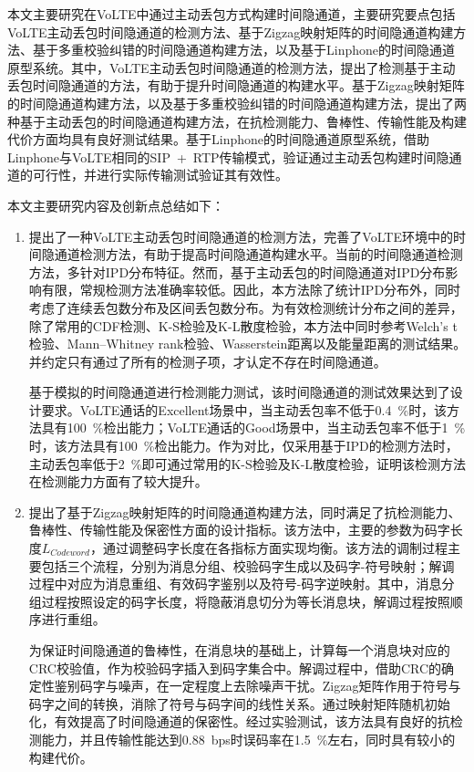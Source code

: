 \begin{conclusion}

本文主要研究在VoLTE中通过主动丢包方式构建时间隐通道，主要研究要点包括VoLTE主动丢包时间隐通道的检测方法、基于Zigzag映射矩阵的时间隐通道构建方法、基于多重校验纠错的时间隐通道构建方法，以及基于Linphone的时间隐通道原型系统。其中，VoLTE主动丢包时间隐通道的检测方法，提出了检测基于主动丢包时间隐通道的方法，有助于提升时间隐通道的构建水平。基于Zigzag映射矩阵的时间隐通道构建方法，以及基于多重校验纠错的时间隐通道构建方法，提出了两种基于主动丢包的时间隐通道构建方法，在抗检测能力、鲁棒性、传输性能及构建代价方面均具有良好测试结果。基于Linphone的时间隐通道原型系统，借助Linphone与VoLTE相同的SIP\ +\ RTP传输模式，验证通过主动丢包构建时间隐通道的可行性，并进行实际传输测试验证其有效性。

本文主要研究内容及创新点总结如下：
\begin{enumerate}
    \item
    提出了一种VoLTE主动丢包时间隐通道的检测方法，完善了VoLTE环境中的时间隐通道检测方法，有助于提高时间隐通道构建水平。当前的时间隐通道检测方法，多针对IPD分布特征。然而，基于主动丢包的时间隐通道对IPD分布影响有限，常规检测方法准确率较低。因此，本方法除了统计IPD分布外，同时考虑了连续丢包数分布及区间丢包数分布。为有效检测统计分布之间的差异，除了常用的CDF检测、K-S检验及K-L散度检验，本方法中同时参考Welch's t检验、Mann–Whitney rank检验、Wasserstein距离以及能量距离的测试结果。并约定只有通过了所有的检测子项，才认定不存在时间隐通道。
    
    基于模拟的时间隐通道进行检测能力测试，该时间隐通道的测试效果达到了设计要求。VoLTE通话的Excellent场景中，当主动丢包率不低于{0.4\ \%}时，该方法具有{100\ \%}检出能力；VoLTE通话的Good场景中，当主动丢包率不低于{1\ \%}时，该方法具有{100\ \%}检出能力。作为对比，仅采用基于IPD的检测方法时，主动丢包率低于{2\ \%}即可通过常用的K-S检验及K-L散度检验，证明该检测方法在检测能力方面有了较大提升。
    
    \item
    提出了基于Zigzag映射矩阵的时间隐通道构建方法，同时满足了抗检测能力、鲁棒性、传输性能及保密性方面的设计指标。该方法中，主要的参数为码字长度$L_{Codeword}$，通过调整码字长度在各指标方面实现均衡。该方法的调制过程主要包括三个流程，分别为消息分组、校验码字生成以及码字-符号映射；解调过程中对应为消息重组、有效码字鉴别以及符号-码字逆映射。其中，消息分组过程按照设定的码字长度，将隐蔽消息切分为等长消息块，解调过程按照顺序进行重组。
    
    为保证时间隐通道的鲁棒性，在消息块的基础上，计算每一个消息块对应的CRC校验值，作为校验码字插入到码字集合中。解调过程中，借助CRC的确定性鉴别码字与噪声，在一定程度上去除噪声干扰。Zigzag矩阵作用于符号与码字之间的转换，消除了符号与码字间的线性关系。通过映射矩阵随机初始化，有效提高了时间隐通道的保密性。经过实验测试，该方法具有良好的抗检测能力，并且传输性能达到{0.88\ bps}时误码率在{1.5\ \%}左右，同时具有较小的构建代价。
    

\end{enumerate}
\end{conclusion}

